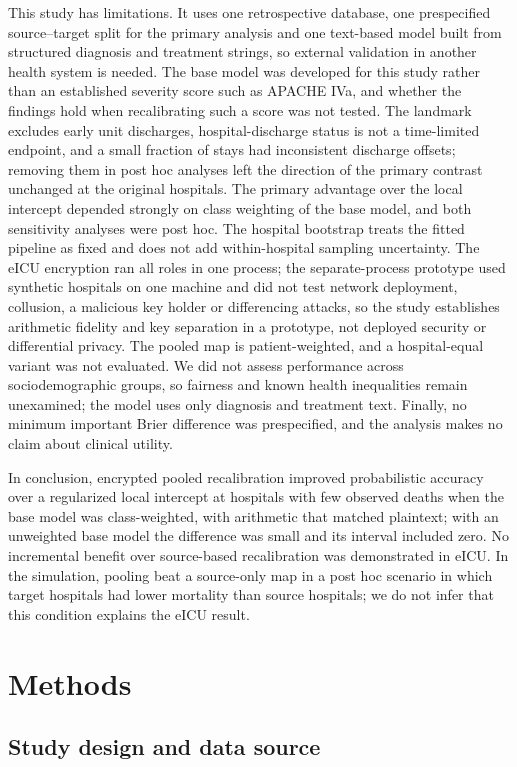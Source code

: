 \documentclass[11pt]{article}
\begin{document}
This study has limitations. It uses one retrospective database, one prespecified source--target split for the primary analysis and one text-based model built from structured diagnosis and treatment strings, so external validation in another health system is needed. The base model was developed for this study rather than an established severity score such as APACHE IVa, and whether the findings hold when recalibrating such a score was not tested. The landmark excludes early unit discharges, hospital-discharge status is not a time-limited endpoint, and a small fraction of stays had inconsistent discharge offsets; removing them in post hoc analyses left the direction of the primary contrast unchanged at the original hospitals. The primary advantage over the local intercept depended strongly on class weighting of the base model, and both sensitivity analyses were post hoc. The hospital bootstrap treats the fitted pipeline as fixed and does not add within-hospital sampling uncertainty. The eICU encryption ran all roles in one process; the separate-process prototype used synthetic hospitals on one machine and did not test network deployment, collusion, a malicious key holder or differencing attacks, so the study establishes arithmetic fidelity and key separation in a prototype, not deployed security or differential privacy. The pooled map is patient-weighted, and a hospital-equal variant was not evaluated. We did not assess performance across sociodemographic groups, so fairness and known health inequalities remain unexamined; the model uses only diagnosis and treatment text. Finally, no minimum important Brier difference was prespecified, and the analysis makes no claim about clinical utility.

In conclusion, encrypted pooled recalibration improved probabilistic accuracy over a regularized local intercept at hospitals with few observed deaths when the base model was class-weighted, with arithmetic that matched plaintext; with an unweighted base model the difference was small and its interval included zero. No incremental benefit over source-based recalibration was demonstrated in eICU. In the simulation, pooling beat a source-only map in a post hoc scenario in which target hospitals had lower mortality than source hospitals; we do not infer that this condition explains the eICU result.

\section*{Methods}
\subsection*{Study design and data source}\label{study-design-and-data-source}
\end{document}
